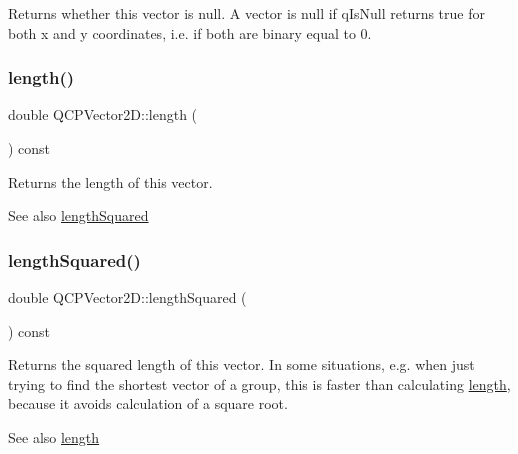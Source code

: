 Returns whether this vector is null. A vector is null if {\ttfamily q\+Is\+Null} returns true for both x and y coordinates, i.\+e. if both are binary equal to 0. \mbox{\label{class_q_c_p_vector2_d_a10adb5ab031fe94f0b64a3c5aefb552e}} 
\subsubsection{\texorpdfstring{length()}{length()}}
{\footnotesize\ttfamily double Q\+C\+P\+Vector2\+D\+::length (\begin{DoxyParamCaption}{ }\end{DoxyParamCaption}) const\hspace{0.3cm}{\ttfamily [inline]}}

Returns the length of this vector.

\begin{DoxySeeAlso}{See also}
\hyperlink{class_q_c_p_vector2_d_a766585459d84cb149334fda1a498b2e5}{length\+Squared} 
\end{DoxySeeAlso}
\mbox{\label{class_q_c_p_vector2_d_a766585459d84cb149334fda1a498b2e5}} 
\subsubsection{\texorpdfstring{length\+Squared()}{lengthSquared()}}
{\footnotesize\ttfamily double Q\+C\+P\+Vector2\+D\+::length\+Squared (\begin{DoxyParamCaption}{ }\end{DoxyParamCaption}) const\hspace{0.3cm}{\ttfamily [inline]}}

Returns the squared length of this vector. In some situations, e.\+g. when just trying to find the shortest vector of a group, this is faster than calculating \hyperlink{class_q_c_p_vector2_d_a10adb5ab031fe94f0b64a3c5aefb552e}{length}, because it avoids calculation of a square root.

\begin{DoxySeeAlso}{See also}
\hyperlink{class_q_c_p_vector2_d_a10adb5ab031fe94f0b64a3c5aefb552e}{length} 
\end{DoxySeeAlso}
\mbox{\label{class_q_c_p_vector2_d_ad83268be370685c2a0630acc0fb1a425}} 
